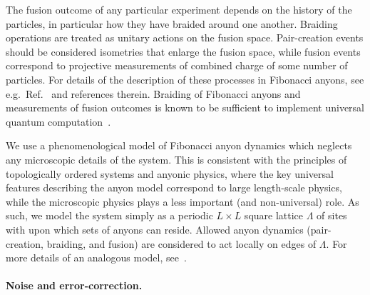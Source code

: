 \documentclass[aps, prl, letterpaper, twocolumn, superscriptaddress, notitlepage, 10pt]{revtex4-1}
\begin{document}
The fusion outcome of any particular experiment depends on the history of the particles, in 
particular how they have braided around one another. Braiding operations are treated as 
unitary actions on the fusion space. Pair-creation events should be considered isometries 
that enlarge the fusion space, while fusion events correspond to projective measurements 
of combined charge of some number of particles. For details of the description of these 
processes in Fibonacci anyons, see e.g.~Ref.~\cite{Nayak2008} and references therein. 
Braiding of Fibonacci anyons and measurements of fusion outcomes is known to be 
sufficient to implement universal quantum computation~\cite{Freedman2002, Nayak2008}.

We use a phenomenological model of Fibonacci anyon dynamics which neglects any 
microscopic details of the system. This is consistent with the principles of topologically 
ordered systems and anyonic physics, where the key universal features describing the 
anyon model correspond to large length-scale physics, while the microscopic physics plays 
a less important (and non-universal) role. As such, we model the system simply as a 
periodic $L\times L$ square lattice $\Lambda$ of sites with upon which sets of anyons can 
reside. Allowed anyon dynamics (pair-creation, braiding, and fusion) are considered to act 
locally on edges of $\Lambda$. For more details of an analogous model, see~\cite{Brell2013}.

\paragraph{Noise and error-correction.}
\end{document}
